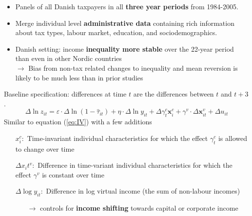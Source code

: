 \documentclass[8pt]{beamer}
\begin{document}
\begin{frame}{\citet{kleven2014estimating}}
  \begin{itemize}
    \item Panels of all Danish taxpayers in all \textbf{three year periods} from 1984-2005.
    \item Merge individual level \textbf{administrative data} containing rich information about tax types, labour market, education, and sociodemographics.
    \item Danish setting: income \textbf{inequality more stable} over the 22-year period than even in other Nordic countries \\
    $\rightarrow$ Bias from non-tax related changes to inequality and mean reversion is likely to be much less than in prior studies
  \end{itemize}
\end{frame}


\begin{frame}{\citet{kleven2014estimating}}
Baseline specification: differences at time $t$ are the differences between $t$ and $t+3$.
  \begin{equation}
    \Delta\ln z_{it} = \varepsilon\cdot\Delta\ln(1-\hat{\tau}_{it}) + \eta\cdot\Delta\ln y_{it} + \Delta\gamma_t^c \bm{x}_i^c + \gamma^v\cdot\Delta\bm{x}_{it}^v + \Delta u_{it}
    \label{eq:IV2}
  \end{equation}
  Similar to equation (\ref{eq:IV}) \citep{gruber2002elasticity} with a few additions
  \begin{itemize}
    \item[$x_i^c:$] Time-invariant individual characteristics for which the effect $\gamma_t^c$ is allowed to change over time
    \item[$\Delta x_it^v:$] Difference in time-variant individual characteristics for which the effect $\gamma^v$ is constant over time
    \item[$\Delta \log y_{it}:$] Difference in log virtual income (the sum of non-labour incomes)
    \begin{itemize}
      \item[$\rightarrow$] controls for \textbf{income shifting} towards capital or corporate income
    \end{itemize}
  \end{itemize}
\end{frame}
\end{document}

